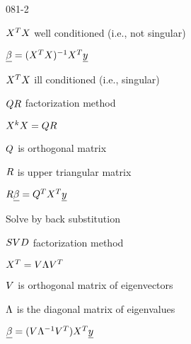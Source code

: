 \begin{mitframe}{081-2}
	\begin{listone}
    	\item $X^{\Temp}X$ well conditioned (i.e., not singular)
        	\begin{listtwo}
            	\item $\uline{\texpcoeff}=(X^{\Temp}X)^{-1}X^{\Temp}\uline{y}$
            \end{listtwo}
        \item $X^{\Temp}X$ ill conditioned (i.e., singular)
        	\begin{listtwo}
            	\item $\heatflow\gasconst$ factorization method
                	\begin{listthree}
                    	\item $X^{\thermcond}X=\heatflow\gasconst$
                        	\begin{listfour}
                            	\item $\heatflow$ is orthogonal matrix
                                \item $\gasconst$ is upper triangular matrix
                            \end{listfour}
                        \item $\gasconst\uline{\texpcoeff}=\heatflow^{\Temp}X^{\Temp}\uline{y}$
                        \begin{listfour}
                        	\item Solve by back substitution
                        \end{listfour}
                    \end{listthree}
                \item $\entropy\vol\elecdisplace$ factorization method
                \begin{listthree}
                	\item $X^{\Temp}=\vol\debroglie\vol^{\Temp}$
                	\begin{listfour}
                    	\item $\vol$ is orthogonal matrix of eigenvectors
                        \item $\debroglie$ is the diagonal matrix of eigenvalues
                    \end{listfour}
                    \item $\uline{\texpcoeff}=(\vol\debroglie^{-1}\vol^{\Temp})X^{\Temp}\uline{y}$
           		\end{listthree}
           \end{listtwo}
    \end{listone}
\end{mitframe}